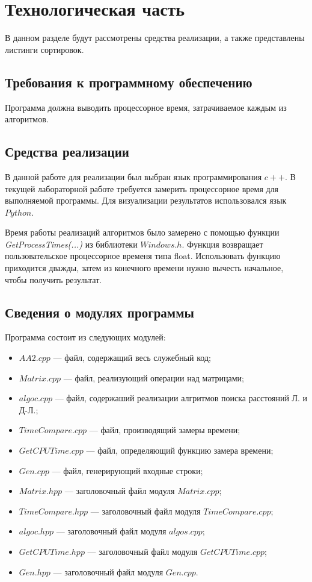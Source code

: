 \chapter{Технологическая часть}
В данном разделе будут рассмотрены средства реализации, а также представлены листинги сортировок.
\section{Требования к программному обеспечению }

Программа должна выводить процессорное время, затрачиваемое каждым из алгоритмов.

\section{Средства реализации}
В данной работе для реализации был выбран язык программирования $c++$. В текущей лабораторной работе требуется замерить процессорное время для выполняемой программы. Для визуализации результатов использовался язык $Python$.

Время работы реализаций алгоритмов было замерено с помощью функции \textit{GetProcessTimes(...)} \cite{time} из библиотеки $Windows.h$. Функция возвращает пользовательское процессорное временя типа float.
Использовать функцию приходится дважды, затем из конечного времени нужно вычесть начальное, чтобы получить результат.


\section{Сведения о модулях программы}
Программа состоит из следующих модулей:
\begin{itemize}
	\item $AA2.cpp$ --- файл, содержащий весь служебный код;
	\item $Matrix.cpp$ --- файл, реализующий операции над матрицами;
	\item $algoc.cpp$ --- файл, содержаший реализации алгритмов поиска расстояний Л. и Д-Л.;
	\item $TimeCompare.cpp$ --- файл, производящий замеры времени;
	\item $GetCPUTime.cpp$ --- файл, определяющий функцию замера времени;
	\item $Gen.cpp$ --- файл, генерирующий входные строки;
	\item $Matrix.hpp$ --- заголовочный файл модуля $Matrix.cpp$;
	\item $TimeCompare.hpp$ --- заголовочный файл модуля $TimeCompare.cpp$;
	\item $algoc.hpp$ --- заголовочный файл модуля $algos.cpp$;
	\item $GetCPUTime.hpp$ --- заголовочный файл модуля $GetCPUTime.cpp$;
	\item $Gen.hpp$ --- заголовочный файл модуля $Gen.cpp$.
\end{itemize}

